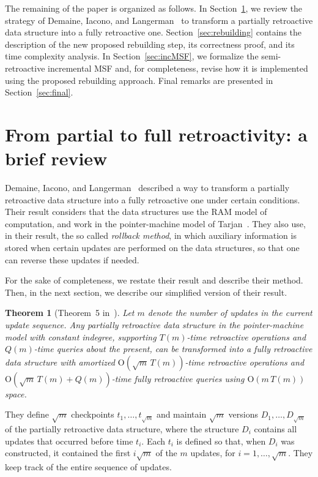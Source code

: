 \documentclass[3p,times,procedia]{elsarticle}
\newcommand{\Oh}{\mathrm{O}}
\newtheorem{theorem}              {Theorem}[section]
\begin{document}
The remaining of the paper is organized as follows. 
In Section~\ref{sec:review}, we review the strategy of Demaine, Iacono, and 
Langerman~\cite{DemaineIL2007} to transform a partially retroactive data structure 
into a fully retroactive one.
Section~\ref{sec:rebuilding} contains the description of the new proposed rebuilding step, 
its correctness proof, and its time complexity analysis. 
In Section~\ref{sec:incMSF}, we formalize the semi-retroactive incremental MSF
and, for completeness, revise how it is implemented using the proposed rebuilding approach. 
Final remarks are presented in Section~\ref{sec:final}.

\section{From partial to full retroactivity: a brief review}\label{sec:review}

Demaine, Iacono, and Langerman~\cite{DemaineIL2007} described a way to transform 
a partially retroactive data structure into a fully retroactive one under certain conditions.
Their result considers that the data structures use the RAM model of computation, 
and work in the pointer-machine model of Tarjan~\cite{Tarjan1979}.
They also use, in their result, the so called \emph{rollback method}, in which 
auxiliary information is stored when certain updates are performed on the data
structures, so that one can reverse these updates if needed.

For the sake of completeness, we restate their result and describe their method. 
Then, in the next section, we describe our simplified version of their result. 

\begin{theorem}[Theorem~5 in~\cite{DemaineIL2007}]
  Let $m$ denote the number of updates in the current update sequence. 
  Any partially retroactive data structure in the pointer-machine model with 
  constant indegree, supporting $T(m)$-time retroactive operations and $Q(m)$-time
  queries about the present, can be transformed into a fully retroactive data
  structure with amortized $\Oh(\sqrt{m}\,T(m))$-time retroactive operations and 
  $\Oh(\sqrt{m}\,T(m)+Q(m))$-time fully retroactive queries using $\Oh(m\,T(m))$ space.
\end{theorem}

They define $\sqrt{m}$ checkpoints $t_1,\ldots,t_{\sqrt{m}}$ and maintain $\sqrt{m}$ 
versions $D_1,\ldots,D_{\sqrt{m}}$ of the partially retroactive data structure, 
where the structure $D_i$ contains all updates that occurred before time $t_i$.
Each $t_i$ is defined so that, when $D_i$ was constructed, it contained 
the first $i\sqrt{m}$ of the $m$ updates, for $i=1,\ldots,\sqrt{m}$. 
They keep track of the entire sequence of updates.
\end{document}
